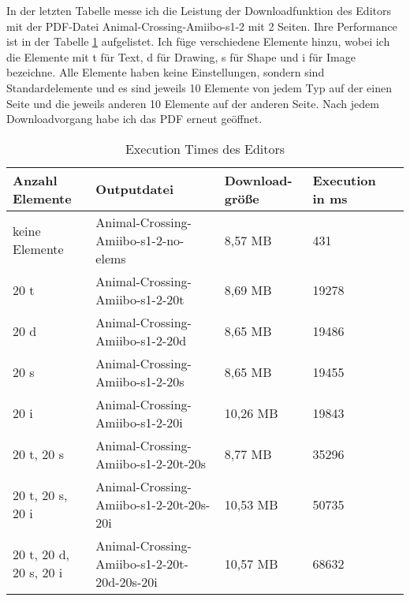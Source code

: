 In der letzten Tabelle messe ich die Leistung der Downloadfunktion des Editors mit der PDF-Datei Animal-Crossing-Amiibo-s1-2 mit 2 Seiten. Ihre Performance ist in der Tabelle \ref{table:editor-dur} aufgelistet. Ich füge verschiedene Elemente hinzu, wobei ich die Elemente mit t für Text, d für Drawing, s für Shape und i für Image bezeichne. Alle Elemente haben keine Einstellungen, sondern sind Standardelemente und es sind jeweils 10 Elemente von jedem Typ auf der einen Seite und die jeweils anderen 10 Elemente auf der anderen Seite. Nach jedem Downloadvorgang habe ich das PDF erneut geöffnet.

\begin{table}[!htbp]
	\centering
	\begin{tabular}{|p{2cm}|p{4cm}|p{2cm}|p{2cm}|p{2cm}|}
		\hline
		\textbf{Anzahl Elemente}			& \textbf{Outputdatei}							& \textbf{Download-größe}	& \textbf{Execution in ms} 	\\ 
		\hline
		keine Elemente 						& Animal-Crossing-Amiibo-s1-2-no-elems			& 8,57 MB					& 431      					\\
		20 t 								& Animal-Crossing-Amiibo-s1-2-20t				& 8,69 MB					& 19278       				\\
		20 d 								& Animal-Crossing-Amiibo-s1-2-20d				& 8,65 MB					& 19486    					\\
		20 s 								& Animal-Crossing-Amiibo-s1-2-20s				& 8,65 MB					& 19455       				\\
		20 i 								& Animal-Crossing-Amiibo-s1-2-20i				& 10,26 MB					& 19843      				\\
		20 t, 20 s 							& Animal-Crossing-Amiibo-s1-2-20t-20s			& 8,77 MB					& 35296      				\\
		20 t, 20 s, 20 i 					& Animal-Crossing-Amiibo-s1-2-20t-20s-20i		& 10,53 MB					& 50735      				\\
		20 t, 20 d, 20 s, 20 i 				& Animal-Crossing-Amiibo-s1-2-20t-20d-20s-20i	& 10,57 MB					& 68632    					\\
		\hline
	\end{tabular}
	\caption{Execution Times des Editors}
	\label{table:editor-dur}
\end{table}